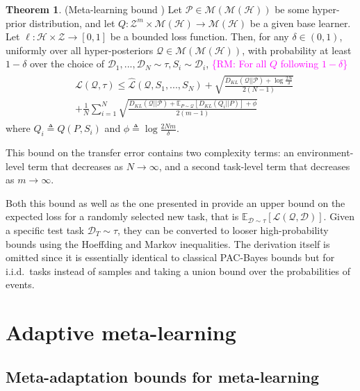 \documentclass[letterpaper]{article} %
\theoremstyle{definition}
\newtheorem{theorem}{Theorem}[section]
\newcommand{\Expect}[2]{\mathbb{E}_{#1}\left [#2 \right ]}
\newcommand{\RM}[1]{\textcolor{magenta}{\{RM: #1\}}}
\begin{document}
\begin{theorem} (Meta-learning bound \citep{Amit2018}) \label{thm:meta-pb}
	Let $\mathcal{P}\in \mathcal{M}(\mathcal{M}(\mathcal{H}))$ be some hyper-prior distribution, and let $Q: \mathcal{Z}^m\times\mathcal{M}(\mathcal{H})\rightarrow \mathcal{M}(\mathcal{H})$ be a given base learner. Let $\ell: \mathcal{H}\times \mathcal{Z}\rightarrow [0, 1]$ be a bounded loss function.
	Then, for any $\delta \in (0,1)$, uniformly over all hyper-posteriors $\mathcal{Q}\in \mathcal{M}(\mathcal{M}(\mathcal{H}))$, with probability at least $1-\delta$ over the choice of $\mathcal{D}_1,...,\mathcal{D}_N\sim \tau, S_i\sim \mathcal{D}_i$, \RM{For all $Q$ following $1-\delta$}
%	
	\begin{align*} 
	\begin{split}
	&\mathcal{L}(\mathcal{Q}, \tau) \leq \hat{\mathcal{L}}(\mathcal{Q}, S_1,...,S_N) 
	+\sqrt{\frac{D_{KL}(\mathcal{Q}||\mathcal{P})+\log\frac{2N}{\delta}}{2(N-1)}} \\
	&+\frac{1}{N}\sum_{i=1}^{N}\sqrt{\frac{D_{KL}(\mathcal{Q}||\mathcal{P})+\Expect{P\sim \mathcal{Q}}{D_{KL}(Q_i||P)}+\phi}{2(m-1)}}
	\end{split}
	\end{align*}
	where $Q_i\triangleq Q(P,S_i)$ and $\phi\triangleq \log\frac{2Nm}{\delta}$.
\end{theorem}

This bound on the transfer error contains two complexity terms: an environment-level term that decreases as $N\rightarrow \infty$, and a second task-level term that decreases as $m\rightarrow \infty$. 

Both this bound as well as the one presented in \cite{Rothfuss2020} provide an upper bound on the expected loss for a randomly selected new task, that is
$\Expect{\mathcal{D}\sim \tau}{\mathcal{L}(\mathcal{Q}, \mathcal{D})}$.
Given a specific test task $\mathcal{D}_T\sim \tau$, they can be converted to looser high-probability bounds using the Hoeffding and Markov inequalities. The derivation itself is omitted since it is essentially identical to classical PAC-Bayes bounds but for i.i.d.\ tasks instead of samples and taking a union bound over the probabilities of events.

\section{Adaptive meta-learning}

\subsection{Meta-adaptation bounds for meta-learning} \label{sec:adapt-general}
\end{document}
